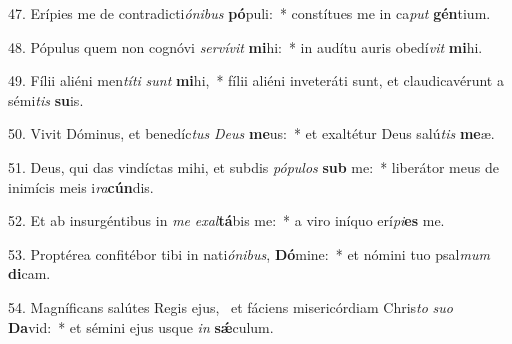 47. Erípies me de contradicti\textit{ó}\textit{ni}\textit{bus} \textbf{pó}puli:~*  constítues me in ca\textit{put} \textbf{gén}tium.\

48. Pópulus quem non cognóvi \textit{ser}\textit{ví}\textit{vit} \textbf{mi}hi:~*  in audítu auris obedí\textit{vit} \textbf{mi}hi.\

49. Fílii aliéni men\textit{tí}\textit{ti} \textit{sunt} \textbf{mi}hi,~*  fílii aliéni inveteráti sunt, et claudicavérunt a sémi\textit{tis} \textbf{su}is.\

50. Vivit Dóminus, et benedíc\textit{tus} \textit{De}\textit{us} \textbf{me}us:~*  et exaltétur Deus salú\textit{tis} \textbf{me}æ.\

51. Deus, qui das vindíctas mihi, et subdis \textit{pó}\textit{pu}\textit{los} \textbf{sub} me:~*  liberátor meus de inimícis meis i\textit{ra}\textbf{cún}dis.\

52. Et ab insurgéntibus in \textit{me} \textit{ex}\textit{al}\textbf{tá}bis me:~*  a viro iníquo erí\textit{pi}\textbf{es} me.\

53. Proptérea confitébor tibi in nati\textit{ó}\textit{ni}\textit{bus}, \textbf{Dó}mine:~*  et nómini tuo psal\textit{mum} \textbf{di}cam.\

54. Magníficans salútes Regis ejus, \dag\  et fáciens misericórdiam Chris\textit{to} \textit{su}\textit{o} \textbf{Da}vid:~*  et sémini ejus usque \textit{in} \textbf{sǽ}culum.\

